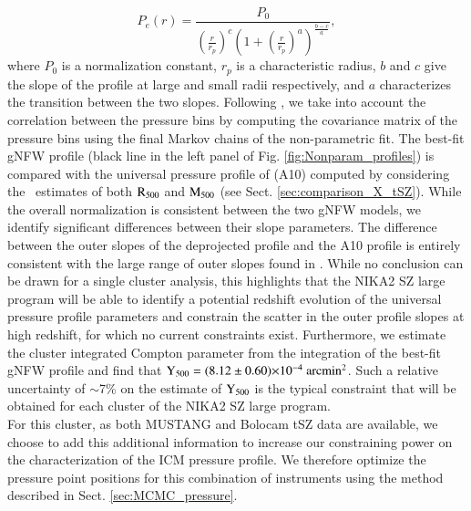 \documentclass[traditabstract]{aa}
\begin{document}
\begin{equation}
        P_e(r) = \frac{P_0}{\left(\frac{r}{r_p}\right)^c \left(1+\left(\frac{r}{r_p}\right)^a\right)^{\frac{b-c}{a}}},
\label{eq:gNFW}
\end{equation}
where $P_0$ is a normalization constant, $r_p$ is a characteristic radius, $b$ and $c$ give the slope of the profile at large and small radii respectively, and $a$ characterizes the transition between the two slopes. Following \cite{rom17}, we take into account the correlation between the pressure bins by computing the covariance matrix of the pressure bins using the final Markov chains of the non-parametric fit. The best-fit gNFW profile (black line in the left panel of Fig. \ref{fig:Nonparam_profiles}) is compared with the universal pressure profile of \cite{arn10} (A10) computed by considering the \xmm\ estimates of both $\rm{R_{500}}$ and $\rm{M_{500}}$ (see Sect. \ref{sec:comparison_X_tSZ}). While the overall normalization is consistent between the two gNFW models, we identify significant differences between their slope parameters. The difference between the outer slopes of the deprojected profile and the A10 profile is entirely consistent with the large range of outer slopes found in \cite{pla13b,say13}. While no conclusion can be drawn for a single cluster analysis, this highlights that the NIKA2 SZ large program will be able to identify a potential redshift evolution of the universal pressure profile parameters and constrain the scatter in the outer profile slopes at high redshift, for which no current constraints exist. Furthermore, we estimate the cluster integrated Compton parameter from the integration of the best-fit gNFW profile and find that $\rm{Y_{500}} = (8.12 \pm 0.60) \mathrm{\times 10^{-4}~arcmin^2}$. Such a relative uncertainty of $\sim$7\% on the estimate of $\rm{Y_{500}}$ is the typical constraint that will be obtained for each cluster of the NIKA2 SZ large program.\\

\indent For this cluster, as both MUSTANG and Bolocam tSZ data are available, we choose to add this additional information to increase our constraining power on the characterization of the ICM pressure profile. We therefore optimize the pressure point positions for this combination of instruments using the method described in Sect. \ref{sec:MCMC_pressure}.\\
\end{document}

